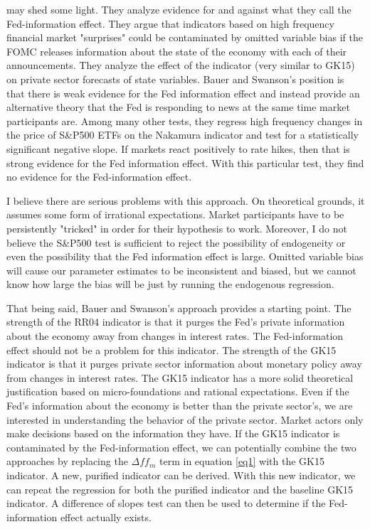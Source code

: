 \documentclass[a4paper,man,floatsintext,natbib]{apa6}
\begin{document}
	\cite{Bauer2020} may shed some light. They analyze evidence for and against what they call the Fed-information effect. They argue that indicators based on high frequency financial market "surprises" could be contaminated by omitted variable bias if the FOMC releases information about the state of the economy with each of their announcements. They analyze the effect of the \cite{Nakamura2018} indicator (very similar to GK15) on private sector forecasts of state variables. Bauer and Swanson's position is that there is weak evidence for the Fed information effect and instead provide an alternative theory that the Fed is responding to news at the same time market participants are. Among many other tests, they regress high frequency changes in the price of S\&P500 ETFs on the Nakamura indicator and test for a statistically significant negative slope. If markets react positively to rate hikes, then that is strong evidence for the Fed information effect. With this particular test, they find no evidence for the Fed-information effect. 
	
	I believe there are serious problems with this approach. On theoretical grounds, it assumes some form of irrational expectations. Market participants have to be persistently "tricked" in order for their hypothesis to work. Moreover, I do not believe the S\&P500 test is sufficient to reject the possibility of endogeneity or even the possibility that the Fed information effect is large. Omitted variable bias will cause our parameter estimates to be inconsistent and biased, but we cannot know how large the bias will be just by running the endogenous regression. 
	
	That being said, Bauer and Swanson's approach provides a starting point. The strength of the RR04 indicator is that it purges the Fed's private information about the economy away from changes in interest rates. The Fed-information effect should not be a problem for this indicator. The strength of the GK15 indicator is that it purges private sector information about monetary policy away from changes in interest rates. The GK15 indicator has a more solid theoretical justification based on micro-foundations and rational expectations. Even if the Fed's information about the economy is better than the private sector's, we are interested in understanding the behavior of the private sector. Market actors only make decisions based on the information they have. If the GK15 indicator is contaminated by the Fed-information effect, we can potentially combine the two approaches by replacing the \(\Delta ff_m\) term in equation \ref{eq1} with the GK15 indicator. A new, purified indicator can be derived. With this new indicator, we can repeat the \cite{Bauer2020} regression for both the purified indicator and the baseline GK15 indicator. A difference of slopes test can then be used to determine if the Fed-information effect actually exists. 
\end{document}
